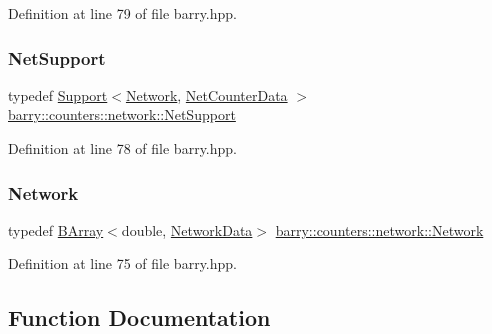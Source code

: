 Definition at line 79 of file barry.\+hpp.

\mbox{\label{namespacebarry_1_1counters_1_1network_a4d30be7f465efd7d218f0264f8386b32}} 
\subsubsection{\texorpdfstring{Net\+Support}{NetSupport}}
{\footnotesize\ttfamily typedef \hyperlink{classbarry_1_1_support}{Support}$<$\hyperlink{namespacebarry_1_1counters_1_1network_a440182967e1ba465e90a4b1d07e3a366}{Network}, \hyperlink{classbarry_1_1counters_1_1network_1_1_net_counter_data}{Net\+Counter\+Data} $>$ \hyperlink{namespacebarry_1_1counters_1_1network_a4d30be7f465efd7d218f0264f8386b32}{barry\+::counters\+::network\+::\+Net\+Support}}



Definition at line 78 of file barry.\+hpp.

\mbox{\label{namespacebarry_1_1counters_1_1network_a440182967e1ba465e90a4b1d07e3a366}} 
\subsubsection{\texorpdfstring{Network}{Network}}
{\footnotesize\ttfamily typedef \hyperlink{classbarry_1_1_b_array}{B\+Array}$<$double, \hyperlink{classbarry_1_1counters_1_1network_1_1_network_data}{Network\+Data}$>$ \hyperlink{namespacebarry_1_1counters_1_1network_a440182967e1ba465e90a4b1d07e3a366}{barry\+::counters\+::network\+::\+Network}}



Definition at line 75 of file barry.\+hpp.



\subsection{Function Documentation}
\mbox{\label{namespacebarry_1_1counters_1_1network_a0150bbe24de4218a40c0880e55c73e9e}} 
